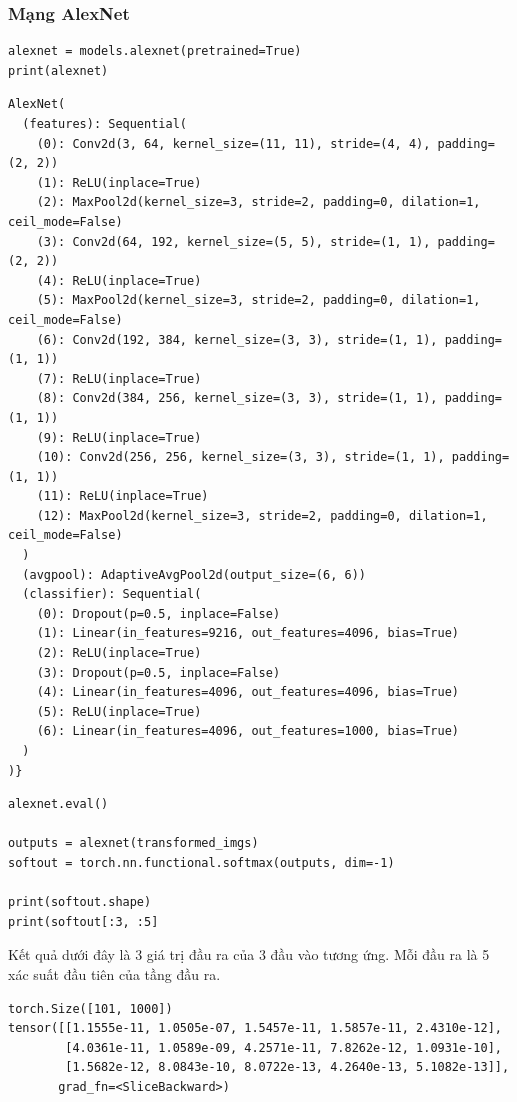 \documentclass[a4paper]{article}
\begin{document}
\subsubsection{Mạng AlexNet}
\begin{lstlisting}
alexnet = models.alexnet(pretrained=True)
print(alexnet)
\end{lstlisting}
\begin{verbatim}
AlexNet(
  (features): Sequential(
    (0): Conv2d(3, 64, kernel_size=(11, 11), stride=(4, 4), padding=(2, 2))
    (1): ReLU(inplace=True)
    (2): MaxPool2d(kernel_size=3, stride=2, padding=0, dilation=1, ceil_mode=False)
    (3): Conv2d(64, 192, kernel_size=(5, 5), stride=(1, 1), padding=(2, 2))
    (4): ReLU(inplace=True)
    (5): MaxPool2d(kernel_size=3, stride=2, padding=0, dilation=1, ceil_mode=False)
    (6): Conv2d(192, 384, kernel_size=(3, 3), stride=(1, 1), padding=(1, 1))
    (7): ReLU(inplace=True)
    (8): Conv2d(384, 256, kernel_size=(3, 3), stride=(1, 1), padding=(1, 1))
    (9): ReLU(inplace=True)
    (10): Conv2d(256, 256, kernel_size=(3, 3), stride=(1, 1), padding=(1, 1))
    (11): ReLU(inplace=True)
    (12): MaxPool2d(kernel_size=3, stride=2, padding=0, dilation=1, ceil_mode=False)
  )
  (avgpool): AdaptiveAvgPool2d(output_size=(6, 6))
  (classifier): Sequential(
    (0): Dropout(p=0.5, inplace=False)
    (1): Linear(in_features=9216, out_features=4096, bias=True)
    (2): ReLU(inplace=True)
    (3): Dropout(p=0.5, inplace=False)
    (4): Linear(in_features=4096, out_features=4096, bias=True)
    (5): ReLU(inplace=True)
    (6): Linear(in_features=4096, out_features=1000, bias=True)
  )
)}
\end{verbatim}
\begin{lstlisting}
alexnet.eval()

outputs = alexnet(transformed_imgs)
softout = torch.nn.functional.softmax(outputs, dim=-1)

print(softout.shape)
print(softout[:3, :5]
\end{lstlisting}
Kết quả dưới đây là 3 giá trị đầu ra của 3 đầu vào tương ứng. Mỗi đầu ra là 5 xác suất đầu tiên của tầng đầu ra.
\begin{verbatim}
torch.Size([101, 1000])
tensor([[1.1555e-11, 1.0505e-07, 1.5457e-11, 1.5857e-11, 2.4310e-12],
        [4.0361e-11, 1.0589e-09, 4.2571e-11, 7.8262e-12, 1.0931e-10],
        [1.5682e-12, 8.0843e-10, 8.0722e-13, 4.2640e-13, 5.1082e-13]],
       grad_fn=<SliceBackward>)
\end{verbatim}
\end{document}
